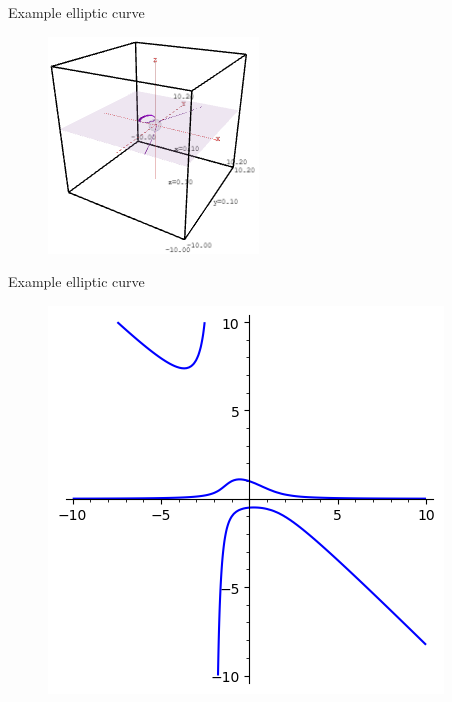 \documentclass[aspectratio=169,xcolor=dvipsnames]{beamer}
\begin{document}
\begin{frame}{Example elliptic curve}
    \begin{figure}
        \centering
        \href{https://doktor-ziel.github.io/ECC/elliptic-curve-05.html}{\includegraphics[height=0.8\textheight]{elliptic-curve-05.png}}
    \end{figure}
\end{frame}


\begin{frame}{Example elliptic curve}
    \begin{figure}
        \centering
        \includegraphics[height=0.8\textheight]{elliptic-curve-06.png}
    \end{figure}
\end{frame}


\end{document}
